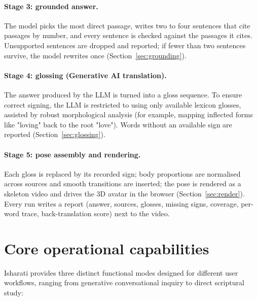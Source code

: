 \paragraph{Stage 3: grounded answer.} The model picks the most direct passage, writes two to four sentences that cite
passages by number, and every sentence is checked against the passages it cites. Unsupported sentences are dropped and
reported; if fewer than two sentences survive, the model rewrites once (Section~\ref{sec:grounding}).

\paragraph{Stage 4: glossing (Generative AI translation).} The answer produced by the LLM is turned into a gloss sequence. To ensure correct signing, the LLM is restricted to using only available lexicon glosses, assisted by robust morphological analysis (for example, mapping inflected forms like "loving" back to the root "love"). Words without an available sign are reported (Section~\ref{sec:glossing}).

\paragraph{Stage 5: pose assembly and rendering.} Each gloss is replaced by its recorded sign; body proportions are
normalised across sources and smooth transitions are inserted; the pose is rendered as a skeleton video and drives the
3D avatar in the browser (Section~\ref{sec:render}). Every run writes a report (answer, sources, glosses, missing signs,
coverage, per-word trace, back-translation score) next to the video.

\section{Core operational capabilities}
\label{sec:modes}
Isharati provides three distinct functional modes designed for different user workflows, ranging from generative conversational inquiry to direct scriptural study:

